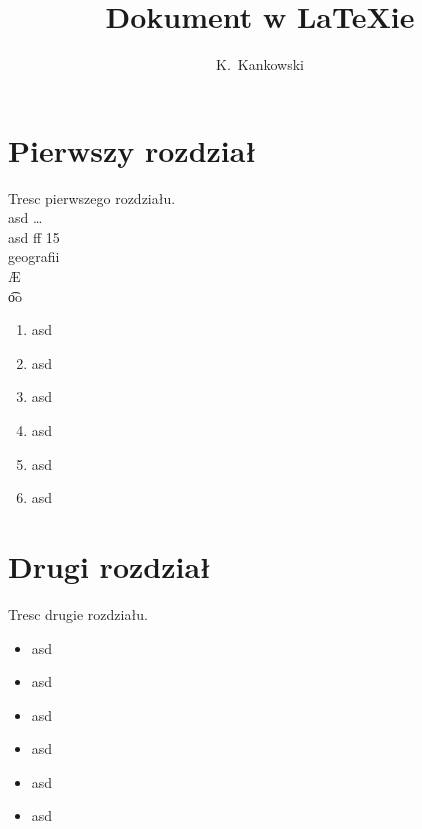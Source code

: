 \documentclass[a4paper,11pt]{article}
\author{K.~Kankowski}
\title{Dokument w LaTeXie}
\begin{document}
\maketitle
\tableofcontents
\section{Pierwszy rozdział}
Tresc pierwszego rozdziału.\\
asd \ldots \\
asd\newline
ff 15\\
geografii\\
\AE\\
\t oo
\begin{enumerate}
\item asd
\item asd
\item asd
\item asd
\item asd
\item asd
\end{enumerate}
\section{Drugi rozdział}
Tresc drugie rozdziału.
\begin{itemize}
\item asd
\item asd
\item asd
\item asd
\item asd
\item asd
\end{itemize}
\end{document}
